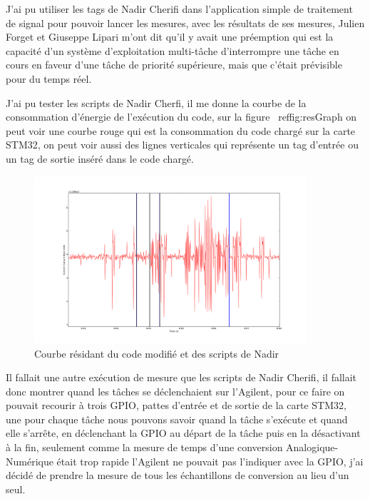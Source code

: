 \documentclass[a4paper]{article}
\begin{document}
J'ai pu utiliser les tags de Nadir Cherifi dans l'application simple de traitement de signal pour pouvoir lancer les mesures, avec les résultats de ses mesures, Julien Forget et Giuseppe Lipari m'ont dit qu'il y avait une préemption qui est la capacité d'un système d'exploitation multi-tâche d'interrompre une tâche en cours en faveur d'une tâche de priorité supérieure, mais que c'était prévisible pour du temps réel.

J'ai pu tester les scripts de Nadir Cherfi, il me donne la courbe de la consommation d'énergie de l'exécution du code, sur la figure ~ref{fig:resGraph} on peut voir une courbe rouge qui est la consommation du code chargé sur la carte STM32, on peut voir aussi des lignes verticales qui représente un tag d'entrée ou un tag de sortie inséré dans le code chargé.

\begin{figure}[H]
\centering
\includegraphics[width=0.9\textwidth]{figure_2.png}
\caption{\label{fig:resGraph} Courbe résidant du code modifié et des scripts de Nadir}
\end{figure}

Il fallait une autre exécution de mesure que les scripts de Nadir Cherifi, il fallait donc montrer quand les tâches se déclenchaient sur l'Agilent, pour ce faire on pouvait recourir à trois GPIO, pattes d'entrée et de sortie de la carte STM32, une pour chaque tâche nous pouvons savoir quand la tâche s'exécute et quand elle s'arrête, en déclenchant la GPIO au départ de la tâche puis en la désactivant à la fin, seulement comme la mesure de temps d'une conversion Analogique-Numérique était trop rapide l'Agilent ne pouvait pas l'indiquer avec la GPIO, j'ai décidé de prendre la mesure de tous les échantillons de conversion au lieu d'un seul.
\end{document}
